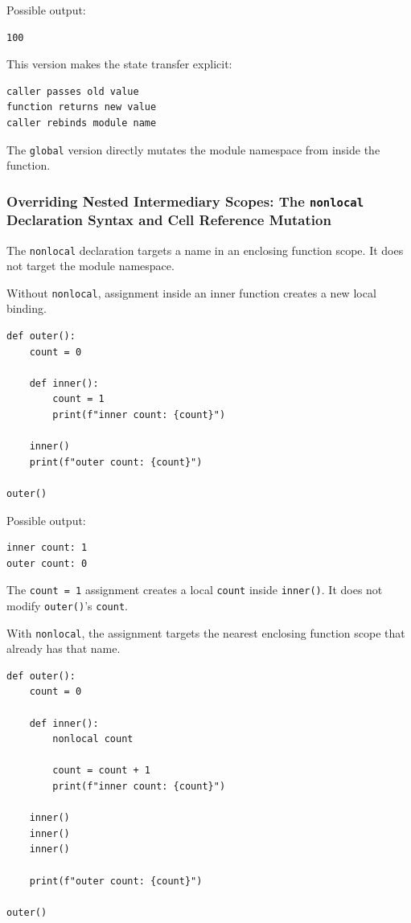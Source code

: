 Possible output:

\begin{verbatim}
100
\end{verbatim}

This version makes the state transfer explicit:

\begin{verbatim}
caller passes old value
function returns new value
caller rebinds module name
\end{verbatim}

The \texttt{global} version directly mutates the module namespace from inside the function.

\subsubsection{Overriding Nested Intermediary Scopes: The \texttt{nonlocal} Declaration Syntax and Cell Reference Mutation}

The \texttt{nonlocal} declaration targets a name in an enclosing function scope. It does not target the module namespace.

Without \texttt{nonlocal}, assignment inside an inner function creates a new local binding.

\begin{verbatim}
def outer():
    count = 0

    def inner():
        count = 1
        print(f"inner count: {count}")

    inner()
    print(f"outer count: {count}")

outer()
\end{verbatim}

Possible output:

\begin{verbatim}
inner count: 1
outer count: 0
\end{verbatim}

The \texttt{count = 1} assignment creates a local \texttt{count} inside \texttt{inner()}. It does not modify \texttt{outer()}'s \texttt{count}.

With \texttt{nonlocal}, the assignment targets the nearest enclosing function scope that already has that name.

\begin{verbatim}
def outer():
    count = 0

    def inner():
        nonlocal count

        count = count + 1
        print(f"inner count: {count}")

    inner()
    inner()
    inner()

    print(f"outer count: {count}")

outer()
\end{verbatim}

